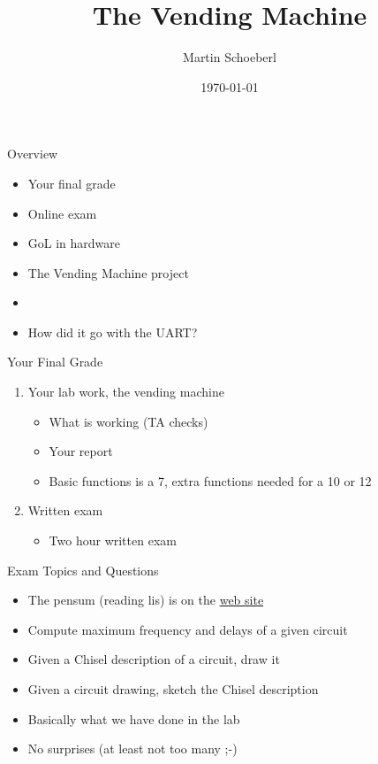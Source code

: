

\newif\ifbook


\title{The Vending Machine}
\author{Martin Schoeberl}
\date{\today}



\begin{frame}
\titlepage
\end{frame}


\begin{frame}[fragile]{Overview}
\begin{itemize}
\item Your final grade
\item Online exam
\item GoL in hardware
\item The Vending Machine project
\item
\item How did it go with the UART?
\end{itemize}
\end{frame}

\begin{frame}[fragile]{Your Final Grade}
\begin{enumerate}
\item Your lab work, the vending machine
\begin{itemize}
\item What is working (TA checks)
\item Your report
\item Basic functions is a 7, extra functions needed for a 10 or 12
\end{itemize}
\item Written exam
\begin{itemize}
\item Two hour written exam
\end{itemize}
\end{enumerate}
\end{frame}

\begin{frame}[fragile]{Exam Topics and Questions}
\begin{itemize}
\item The pensum (reading lis) is on the \href{http://www2.imm.dtu.dk/courses/02139/}{web site}
\item Compute maximum frequency and delays of a given circuit
\item Given a Chisel description of a circuit, draw it
\item Given a circuit drawing, sketch the Chisel description
\item Basically what we have done in the lab
\item No surprises (at least not too many ;-)
\end{itemize}
\end{frame}


